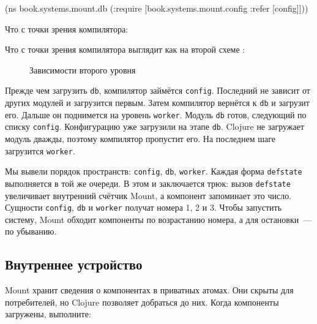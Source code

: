 \else

\begin{english}
  \begin{clojure}
(ns book.systems.mount.db
  (:require
   [book.systems.mount.config :refer [config]]))
  \end{clojure}
\end{english}

\fi

\ifprint

\noindent
Что с точки зрения компилятора:

\begin{figure}[h!]
\end{figure}

\fi

\ifebook

\noindent
Что с точки зрения компилятора выглядит как на второй схеме
:

\begin{figure}[b!]
  \caption{Зависимости второго уровня}
  \label{fig:chart-sys-3}
\end{figure}

\fi

Прежде чем загрузить \verb|db|, компилятор займётся \verb|config|. Последний
не зависит от других модулей и загрузится первым. Затем компилятор вернётся к
\verb|db| и загрузит его. Дальше он поднимется на уровень
\verb|worker|. Модуль \verb|db| готов, следующий по списку
\verb|config|. Конфигурацию уже загрузили на этапе \verb|db|. Clojure не
загружает модуль дважды, поэтому компилятор пропустит его. На последнем шаге
загрузится \verb|worker|.


Мы вывели порядок пространств: \verb|config|, \verb|db|, \verb|worker|. Каждая
форма \verb|defstate| выполняется в той же очереди. В этом и заключается трюк:
вызов \verb|defstate| увеличивает внутренний счётчик Mount, а компонент
запоминает это число. Сущности \verb|config|, \verb|db| и \verb|worker| получат
номера 1, 2 и 3. Чтобы запустить систему, Mount обходит компоненты по
возрастанию номера, а для остановки~--- по убыванию.

\subsection{Внутреннее устройство}

Mount хранит сведения о компонентах в приватных атомах. Они скрыты для
потребителей, но Clojure позволяет добраться до них. Когда компоненты загружены,
выполните:

